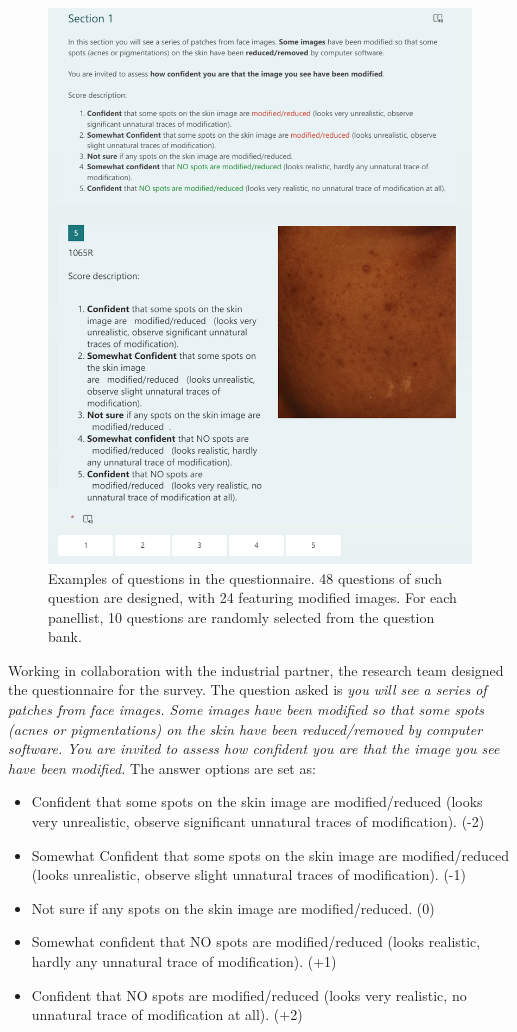 \begin{spacing}{1.5}
\begin{figure}[t!]
    \includegraphics[width=0.9\columnwidth]{Chapter4/sample_form1.png}
    \caption{Examples of questions in the questionnaire. 48 questions of such question are designed, with 24 featuring modified images. For each panellist, 10 questions are randomly selected from the question bank.}
    \label{fig:sample_form}
\end{figure}
Working in collaboration with the industrial partner, the research team designed the questionnaire for the survey. The question asked is \textit{you will see a series of patches from face images. Some images have been modified so that some spots (acnes or pigmentations) on the skin have been reduced/removed by computer software. You are invited to assess how confident you are that the image you see have been modified.} The answer options are set as:
\begin{itemize}
    \item Confident that some spots on the skin image are modified/reduced (looks very unrealistic, observe significant unnatural traces of modification). (-2)
    \item Somewhat Confident that some spots on the skin image are modified/reduced (looks unrealistic, observe slight unnatural traces of modification). (-1)
    \item Not sure if any spots on the skin image are modified/reduced. (0)
    \item Somewhat confident that NO spots are modified/reduced (looks realistic, hardly any unnatural trace of modification). (+1)
    \item Confident that NO spots are modified/reduced (looks very realistic, no unnatural trace of modification at all). (+2)
\end{itemize}


\end{spacing}

